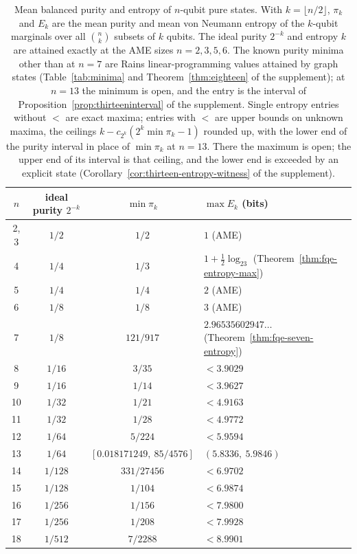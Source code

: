 \documentclass[11pt]{article}
\begin{document}
\begin{table}[htbp]
\centering\small
\begin{tabular}{@{}cccl@{}}
\toprule
$n$ & ideal purity $2^{-k}$ & $\min\pi_k$ & $\max E_k$ (bits)\\
\midrule
2, 3 & $1/2$ & $1/2$ & $1$ (AME)\\
4 & $1/4$ & $1/3$ & $1+\tfrac12\log_23$ (Theorem~\ref{thm:fqe-entropy-max})\\
5 & $1/4$ & $1/4$ & $2$ (AME)\\
6 & $1/8$ & $1/8$ & $3$ (AME)\\
7 & $1/8$ & $121/917$ & $2.96535602947\ldots$ (Theorem~\ref{thm:fqe-seven-entropy})\\
8 & $1/16$ & $3/35$ & $<3.9029$\\
9 & $1/16$ & $1/14$ & $<3.9627$\\
10 & $1/32$ & $1/21$ & $<4.9163$\\
11 & $1/32$ & $1/28$ & $<4.9772$\\
12 & $1/64$ & $5/224$ & $<5.9594$\\
13 & $1/64$ & $[0.018171249,\ 85/4576]$ & $(5.8336,\ 5.9846)$\\
14 & $1/128$ & $331/27456$ & $<6.9702$\\
15 & $1/128$ & $1/104$ & $<6.9874$\\
16 & $1/256$ & $1/156$ & $<7.9800$\\
17 & $1/256$ & $1/208$ & $<7.9928$\\
18 & $1/512$ & $7/2288$ & $<8.9901$\\
\bottomrule
\end{tabular}
\caption{Mean balanced purity and entropy of $n$-qubit pure states. With $k=\lfloor n/2\rfloor$, $\pi_k$ and $E_k$ are
the mean purity and mean von Neumann entropy of the $k$-qubit marginals over all $\binom nk$ subsets of $k$ qubits. The
ideal purity $2^{-k}$ and entropy $k$ are attained exactly at the AME sizes $n=2,3,5,6$. The known purity minima other than
at $n=7$ are Rains linear-programming values attained by graph states (Table~\ref{tab:minima} and
Theorem~\ref{thm:eighteen} of the supplement); at $n=13$ the minimum is open, and the entry is the interval of
Proposition~\ref{prop:thirteeninterval} of the supplement. Single entropy entries without $<$ are exact maxima; entries with $<$
are upper bounds on unknown maxima, the ceilings $k-c_{2^k}(2^k\min\pi_k-1)$ rounded up, with the lower end of the
purity interval in place of $\min\pi_k$ at $n=13$. There the maximum is open; the upper end of its interval is that
ceiling, and the lower end is exceeded by an explicit state (Corollary~\ref{cor:thirteen-entropy-witness} of the
supplement).}
\label{tab:fqe-other-n}
\end{table}
\end{document}
